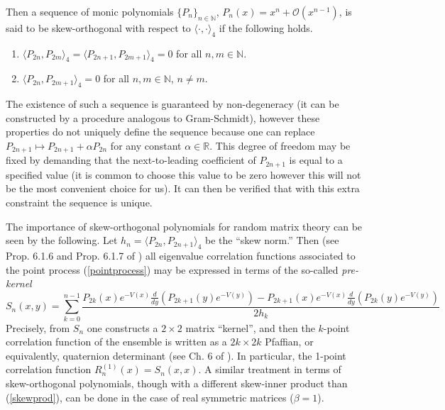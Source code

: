 \documentclass[12pt]{article}
\theoremstyle{definition}
\begin{document}
Then a sequence of monic polynomials $\{ P_n \}_{n \in \mathbb{N}}$,  $P_n(x) = x^n + \mathcal{O}(x^{n-1})$,  is said to be skew-orthogonal with respect to $\langle \cdot, \cdot \rangle_4$ if the following holds.
\begin{enumerate}
\item $\langle P_{2n}, P_{2m} \rangle_4 = \langle P_{2n+1}, P_{2m+1} \rangle_4  = 0$ for all $n,m \in \mathbb{N}$.
\item $\langle P_{2n}, P_{2m+1} \rangle_4 = 0$ for all $n, m \in \mathbb{N}$, $n\neq m$.
\end{enumerate}
The existence of such a sequence is guaranteed by non-degeneracy (it can be constructed by a procedure analogous to Gram-Schmidt), however these properties do not uniquely define the sequence because one can replace $P_{2n+1} \mapsto P_{2n+1} + \alpha P_{2n}$ for any constant $\alpha \in \mathbb{R}$. This degree of freedom may be fixed by demanding that the next-to-leading coefficient of $P_{2n+1}$ is equal to a specified value (it is common to choose this value to be zero however this will not be the most convenient choice for us).  It can then be verified that with this extra constraint the sequence is unique. 

The importance of skew-orthogonal polynomials for random matrix theory can be seen by the following. Let $h_n = \langle P_{2n}, P_{2n+1} \rangle_4$ be the \enquote{skew norm.} Then (see Prop. 6.1.6 and Prop. 6.1.7 of \cite{loggases}) all eigenvalue correlation functions associated to the point process (\ref{pointprocess}) may be expressed in terms of the so-called \textit{pre-kernel}
\begin{equation}\label{prekernel}
S_n(x,y) = \sum_{k=0}^{n-1} \frac{ P_{2k}(x) e^{-V(x)} \frac{d}{dy}\left( P_{2k+1}(y) e^{-V(y)} \right) - P_{2k+1}(x) e^{-V(x)} \frac{d}{dy}\left( P_{2k}(y) e^{-V(y)} \right)}{2 h_k}
\end{equation}
Precisely, from $S_n$ one constructs a $2 \times 2$ matrix \enquote{kernel}, and then the $k$-point correlation function of the ensemble is written as a $2k \times 2k$ Pfaffian, or equivalently,  quaternion determinant (see Ch. 6 of \cite{loggases}). In particular, the 1-point correlation function $R_n^{(1)}(x) = S_n(x,x)$. A similar treatment in terms of skew-orthogonal polynomials, though with a different skew-inner product than (\ref{skewprod}), can be done in the case of real symmetric matrices ($\beta =1$).
\end{document}
